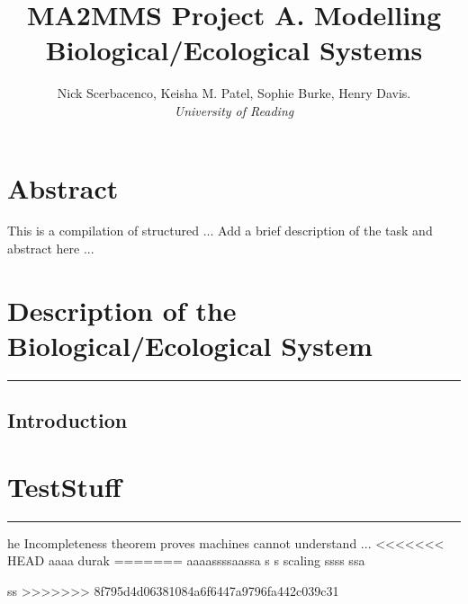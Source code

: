 \documentclass[11pt]{article}
\title{\textbf{MA2MMS Project A. Modelling Biological/Ecological Systems}}
\author{Nick Scerbacenco, Keisha M. Patel, Sophie Burke, Henry Davis. \\
        \textit{University of Reading}}
\date{ }
\begin{document}
\pagestyle{fancy}


\maketitle
\thispagestyle{empty} 

\section*{\textbf{Abstract}}
This is a compilation of structured ... Add a brief description of the task and abstract here ...

\tableofcontents

\newpage


\section{Description of the Biological/Ecological System}
\hrule height 0.8pt 
\vspace{5mm}

\subsection{Introduction}


\newpage
\section{TestStuff}
\hrule height 0.8pt 
\vspace{5mm}

\lettrine[findent=2pt]{}{ } he Incompleteness theorem proves machines cannot understand ...
<<<<<<< HEAD
aaaa durak
=======
aaaassssaassa s s scaling
ssss ssa

ss
>>>>>>> 8f795d4d06381084a6f6447a9796fa442c039c31

\end{document}
